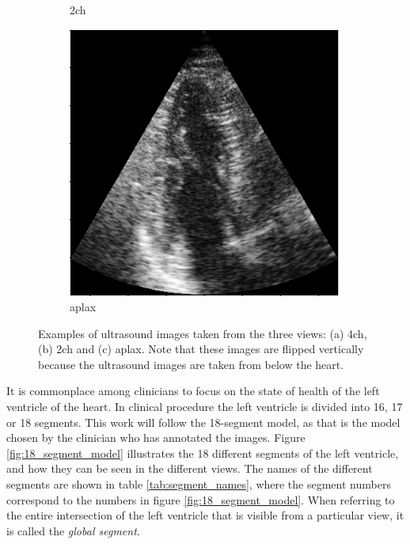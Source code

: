 \begin{figure}[H]
\begin{subfigure}[b]{0.3\textwidth}
        \caption{\acrshort{2ch}}
        \label{fig:us_view_examples_2ch}
    \end{subfigure}
    \begin{subfigure}[b]{0.3\textwidth}
        \includegraphics[width=0.99\textwidth]{echocardiography/aplax_frame.png}
        \caption{\acrshort{aplax}}
        \label{fig:us_view_examples_aplax}
    \end{subfigure}
    \caption{Examples of ultrasound images taken from the three views: (a) \acrfull{4ch}, (b) \acrfull{2ch} and (c) \acrfull{aplax}. Note that these images are flipped vertically because the ultrasound images are taken from below the heart.}
    \label{fig:us_view_examples}
\end{figure}

It is commonplace among clinicians to focus on the state of health of the left ventricle of the heart. In clinical procedure the left ventricle is divided into 16, 17 or 18 segments. This work will follow the 18-segment model, as that is the model chosen by the clinician who has annotated the images. Figure \ref{fig:18_segment_model} illustrates the 18 different segments of the left ventricle, and how they can be seen in the different views. The names of the different segments are shown in table \ref{tab:segment_names}, where the segment numbers correspond to the numbers in figure \ref{fig:18_segment_model}. When referring to the entire intersection of the left ventricle that is visible from a particular view, it is called the \textit{global segment}.

